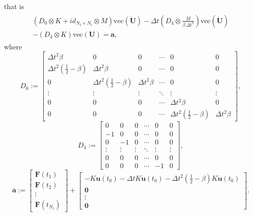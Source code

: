 \documentclass{ws-m3as}
\begin{document}
that is
\begin{align}
\begin{array}{c}
\left(D_0 \otimes K + id_{N_t \times N_t} \otimes  M  \right) \mathrm{vec}(\ddot{\mathbf{U}}) - \Delta t \left(D_4 \otimes  \frac{M}{\beta\, \Delta t^2}\right)\mathrm{vec}(\dot{\mathbf{U}}) \\
- \left( D_4 \otimes   K\right)\mathrm{vec}(\mathbf{U}) =
\mathbf{a},
\end{array}\label{newmark1}
\end{align}
where
$$
D_0 := \left[
\begin{array}{cccccc}
\Delta t^2 \beta  & 0 & 0 & \cdots & 0 & 0 \\
\Delta t^2 \left(\frac{1}{2} - \beta \right) & \Delta t^2 \beta & 0 & \cdots & 0 & 0 \\
0 & \Delta t^2 \left(\frac{1}{2} - \beta \right) & \Delta t^2 \beta & \cdots & 0 & 0 \\
\vdots & \vdots & \vdots & \ddots & \vdots & \vdots \\
0 & 0 & 0 & \cdots & \Delta t^2 \beta & 0 \\
0 & 0 & 0 & \cdots & \Delta t^2 \left(\frac{1}{2} - \beta \right) & \Delta t^2 \beta  
\end{array}  
\right],
$$
$$
D_4 := \left[
\begin{array}{cccccc}
0  & 0 & 0 & \cdots & 0 & 0 \\
-1 & 0 & 0 & \cdots & 0 & 0 \\
0 & -1 & 0 & \cdots & 0 & 0 \\
\vdots & \vdots & \vdots & \ddots & \vdots & \vdots \\
0 & 0 & 0 & \cdots & 0 & 0 \\
0 & 0 & 0 & \cdots & -1 & 0 
\end{array}  
\right],
$$
$$
\mathbf{a}:= \left[
\begin{array}{c}
\mathbf{F}(t_1)\\
\mathbf{F}(t_2) \\
\vdots \\
\mathbf{F}(t_{N_t}) 
\end{array}
\right] + 
\left[
\begin{array}{c}
-  K  \mathbf{u}(t_0) - \Delta t K \dot{\mathbf{u}}(t_0) - \Delta t^2 \left( \frac{1}{2}-\beta \right) K \ddot{\mathbf{u}}(t_0)\\
\mathbf{0} \\
\vdots \\
\mathbf{0} 
\end{array}
\right].
$$
\end{document}
